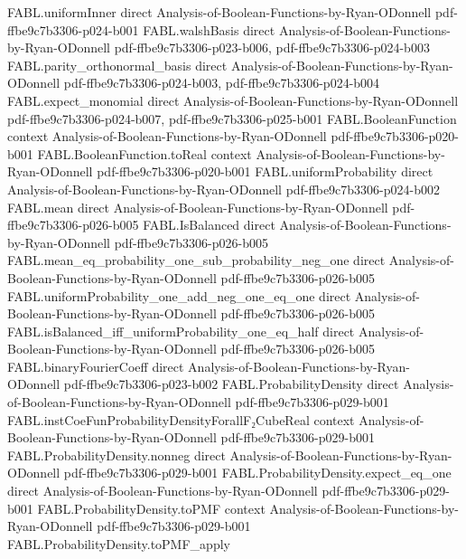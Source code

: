 \begin{theorem}
\proofstep
  {FABL.uniformInner}
  {direct}
  {Analysis-of-Boolean-Functions-by-Ryan-ODonnell}
  {pdf-ffbe9c7b3306-p024-b001}
\proofstep
  {FABL.walshBasis}
  {direct}
  {Analysis-of-Boolean-Functions-by-Ryan-ODonnell}
  {pdf-ffbe9c7b3306-p023-b006,
    pdf-ffbe9c7b3306-p024-b003}
\proofstep
  {FABL.parity_orthonormal_basis}
  {direct}
  {Analysis-of-Boolean-Functions-by-Ryan-ODonnell}
  {pdf-ffbe9c7b3306-p024-b003,
    pdf-ffbe9c7b3306-p024-b004}
\proofstep
  {FABL.expect_monomial}
  {direct}
  {Analysis-of-Boolean-Functions-by-Ryan-ODonnell}
  {pdf-ffbe9c7b3306-p024-b007,
    pdf-ffbe9c7b3306-p025-b001}
\proofstep
  {FABL.BooleanFunction}
  {context}
  {Analysis-of-Boolean-Functions-by-Ryan-ODonnell}
  {pdf-ffbe9c7b3306-p020-b001}
\proofstep
  {FABL.BooleanFunction.toReal}
  {context}
  {Analysis-of-Boolean-Functions-by-Ryan-ODonnell}
  {pdf-ffbe9c7b3306-p020-b001}
\proofstep
  {FABL.uniformProbability}
  {direct}
  {Analysis-of-Boolean-Functions-by-Ryan-ODonnell}
  {pdf-ffbe9c7b3306-p024-b002}
\proofstep
  {FABL.mean}
  {direct}
  {Analysis-of-Boolean-Functions-by-Ryan-ODonnell}
  {pdf-ffbe9c7b3306-p026-b005}
\proofstep
  {FABL.IsBalanced}
  {direct}
  {Analysis-of-Boolean-Functions-by-Ryan-ODonnell}
  {pdf-ffbe9c7b3306-p026-b005}
\proofstep
  {FABL.mean_eq_probability_one_sub_probability_neg_one}
  {direct}
  {Analysis-of-Boolean-Functions-by-Ryan-ODonnell}
  {pdf-ffbe9c7b3306-p026-b005}
\proofstep
  {FABL.uniformProbability_one_add_neg_one_eq_one}
  {direct}
  {Analysis-of-Boolean-Functions-by-Ryan-ODonnell}
  {pdf-ffbe9c7b3306-p026-b005}
\proofstep
  {FABL.isBalanced_iff_uniformProbability_one_eq_half}
  {direct}
  {Analysis-of-Boolean-Functions-by-Ryan-ODonnell}
  {pdf-ffbe9c7b3306-p026-b005}
\proofstep
  {FABL.binaryFourierCoeff}
  {direct}
  {Analysis-of-Boolean-Functions-by-Ryan-ODonnell}
  {pdf-ffbe9c7b3306-p023-b002}
\proofstep
  {FABL.ProbabilityDensity}
  {direct}
  {Analysis-of-Boolean-Functions-by-Ryan-ODonnell}
  {pdf-ffbe9c7b3306-p029-b001}
\proofstep
  {FABL.instCoeFunProbabilityDensityForallF₂CubeReal}
  {context}
  {Analysis-of-Boolean-Functions-by-Ryan-ODonnell}
  {pdf-ffbe9c7b3306-p029-b001}
\proofstep
  {FABL.ProbabilityDensity.nonneg}
  {direct}
  {Analysis-of-Boolean-Functions-by-Ryan-ODonnell}
  {pdf-ffbe9c7b3306-p029-b001}
\proofstep
  {FABL.ProbabilityDensity.expect_eq_one}
  {direct}
  {Analysis-of-Boolean-Functions-by-Ryan-ODonnell}
  {pdf-ffbe9c7b3306-p029-b001}
\proofstep
  {FABL.ProbabilityDensity.toPMF}
  {context}
  {Analysis-of-Boolean-Functions-by-Ryan-ODonnell}
  {pdf-ffbe9c7b3306-p029-b001}
\proofstep
  {FABL.ProbabilityDensity.toPMF_apply}

\end{theorem}
